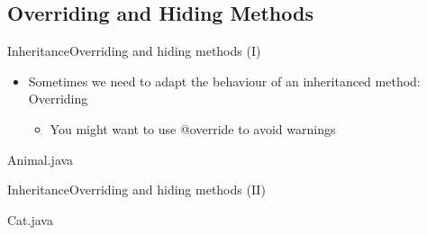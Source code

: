 \documentclass[10pt,compress]{beamer} %
\begin{document}
\subsection{Overriding and Hiding Methods}
\begin{frame}[shrink]{Inheritance}{Overriding and hiding methods (I)}
	\begin{itemize}
	\item Sometimes we need to adapt the behaviour of an inheritanced method: \alert{Overriding}
	\begin{itemize}
	\item You might want to use \alert{@override} to avoid warnings
	\end{itemize}

	\end{itemize}

	\vspace{-0.2cm}
	\begin{block}{Animal.java}
		\vspace{-0.2cm}
		
		\vspace{-0.2cm}
	\end{block}
\end{frame}

\begin{frame}[shrink]{Inheritance}{Overriding and hiding methods (II)}
	\vspace{-0.2cm}
	\begin{block}{Cat.java}
		\vspace{-0.2cm}
		
		\vspace{-0.2cm}
	\end{block}
\end{frame}
\end{document}

